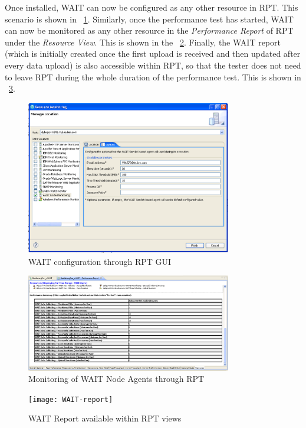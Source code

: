\documentclass[runningheads,a4paper]{llncs}
\begin{document}
Once installed, WAIT can now be configured as any other resource in RPT. This
scenario is shown in \figurename ~\ref{fig_config}. Similarly, once the performance
test has started, WAIT can now be monitored as any other resource in the
\emph{Performance Report} of RPT under the \emph{Resource View}. This is shown
in the \figurename ~\ref{fig_mon}. Finally, the WAIT report (which is initially created 
once the first upload is received and then updated after every data
upload) is also accessible within RPT, so that the tester does not need to
leave RPT during the whole duration of the performance test. This is shown
in \figurename ~\ref{fig_report}.

\begin{figure}[!h]
\centering
\includegraphics[totalheight=.3\textheight,width=0.8\textwidth]{WAIT-config}
\caption{WAIT configuration through RPT GUI}
\label{fig_config}
\end{figure}

\begin{figure}[!h]
\centering
\includegraphics[totalheight=.3\textheight,width=0.8\textwidth]{WAIT-monitoring}
\caption{Monitoring of WAIT Node Agents through RPT}
\label{fig_mon}
\end{figure}

\begin{figure}[!h]
\centering
\texttt{[image: WAIT-report]}
\caption{WAIT Report available within RPT views}
\label{fig_report}
\end{figure}
\end{document}
